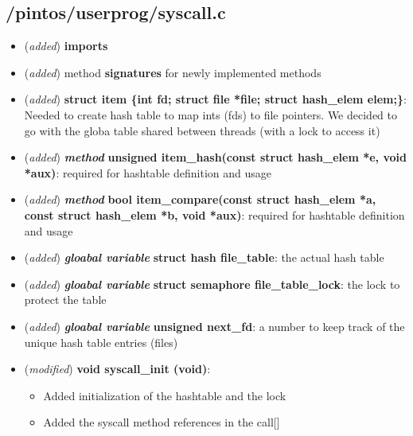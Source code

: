 \documentclass[11pt]{scrartcl}
\begin{document}
\subsection*{/pintos/userprog/syscall.c}

\begin{itemize}
    \item (\textit{added}) \textbf{imports}
    
    \item (\textit{added}) method \textbf{signatures} for newly implemented methods
    
    \item (\textit{added}) \textbf{struct item \{int fd; struct file *file; struct hash\_elem elem;\}}: Needed to create hash table to map ints (fds) to file pointers. We decided to go with the globa table shared between threads (with a lock to access it)
    
    \item (\textit{added}) \textbf{\textit{method}} \textbf{unsigned item\_hash(const struct hash\_elem *e, void *aux)}: required for hashtable definition and usage
    
    \item (\textit{added}) \textbf{\textit{method}} \textbf{bool item\_compare(const struct hash\_elem *a, const struct hash\_elem *b, void *aux)}: required for hashtable definition and usage
    
    \item (\textit{added}) \textbf{\textit{gloabal variable}} \textbf{struct hash file\_table}: the actual hash table 
    
    \item (\textit{added}) \textbf{\textit{gloabal variable}} \textbf{struct semaphore file\_table\_lock}: the lock to protect the table 
    
        \item (\textit{added}) \textbf{\textit{gloabal variable}} \textbf{unsigned next\_fd}: a number to keep track of the unique hash table entries (files)
        
    \item (\textit{modified}) \textbf{void syscall\_init (void)}: 
    \begin{itemize}
        \item[] Added initialization of the hashtable and the lock
        \item[] Added the syscall method references in the call[]
    \end{itemize}


\end{itemize}
\end{document}
